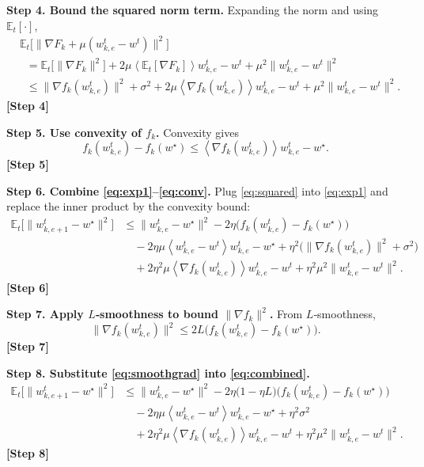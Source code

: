 \documentclass{article}
\newcommand{\EE}{\mathbb{E}}
\newcommand{\inner}[1]{\left\langle #1 \right\rangle}
\begin{document}
\noindent\textbf{Step 4.  Bound the squared norm term.}  
Expanding the norm and using $\EE_t[\cdot]$,
\begin{align}
&\EE_t\!\big[\|\nabla F_k+\mu(w^{t}_{k,e}-w^{t})\|^2\big] \nonumber\\
&\;\;= \EE_t\!\big[\|\nabla F_k\|^2\big]
    +2\mu\inner{\EE_t[\nabla F_k]}{w^{t}_{k,e}-w^{t}}
    +\mu^2\|w^{t}_{k,e}-w^{t}\|^2 \nonumber\\
&\;\;\le \|\nabla f_k(w^{t}_{k,e})\|^2+\sigma^2
    +2\mu\inner{\nabla f_k(w^{t}_{k,e})}{w^{t}_{k,e}-w^{t}}
    +\mu^2\|w^{t}_{k,e}-w^{t}\|^2 . \label{eq:squared}
\end{align}
\textbf{[Step 4]}

\noindent\textbf{Step 5.  Use convexity of $f_k$.}  
Convexity gives
\[
f_k(w^{t}_{k,e})-f_k(w^\star)\le\inner{\nabla f_k(w^{t}_{k,e})}{w^{t}_{k,e}-w^\star}. \label{eq:conv}
\]
\textbf{[Step 5]}

\noindent\textbf{Step 6.  Combine \eqref{eq:exp1}–\eqref{eq:conv}.}  
Plug \eqref{eq:squared} into \eqref{eq:exp1} and replace the inner product by the convexity bound:
\begin{align}
\EE_t\!\big[\|w^{t}_{k,e+1}-w^\star\|^2\big]
&\le \|w^{t}_{k,e}-w^\star\|^2
   -2\eta\big(f_k(w^{t}_{k,e})-f_k(w^\star)\big)                     \nonumber\\
&\quad -2\eta\mu\inner{w^{t}_{k,e}-w^{t}}{w^{t}_{k,e}-w^\star}
   +\eta^2\Big(\|\nabla f_k(w^{t}_{k,e})\|^2+\sigma^2\Big)           \nonumber\\
&\quad +2\eta^2\mu\inner{\nabla f_k(w^{t}_{k,e})}{w^{t}_{k,e}-w^{t}}
   +\eta^2\mu^2\|w^{t}_{k,e}-w^{t}\|^2 . \label{eq:combined}
\end{align}
\textbf{[Step 6]}

\noindent\textbf{Step 7.  Apply $L$‑smoothness to bound $\|\nabla f_k\|^2$.}  
From $L$‑smoothness,
\[
\|\nabla f_k(w^{t}_{k,e})\|^2\le 2L\big(f_k(w^{t}_{k,e})-f_k(w^\star)\big). \label{eq:smoothgrad}
\]
\textbf{[Step 7]}

\noindent\textbf{Step 8.  Substitute \eqref{eq:smoothgrad} into \eqref{eq:combined}.}  
\begin{align}
\EE_t\!\big[\|w^{t}_{k,e+1}-w^\star\|^2\big]
&\le \|w^{t}_{k,e}-w^\star\|^2
   -2\eta\big(1-\eta L\big)\big(f_k(w^{t}_{k,e})-f_k(w^\star)\big) \nonumber\\
&\quad -2\eta\mu\inner{w^{t}_{k,e}-w^{t}}{w^{t}_{k,e}-w^\star}
   +\eta^2\sigma^2                                          \nonumber\\
&\quad +2\eta^2\mu\inner{\nabla f_k(w^{t}_{k,e})}{w^{t}_{k,e}-w^{t}}
   +\eta^2\mu^2\|w^{t}_{k,e}-w^{t}\|^2 . \label{eq:post-smooth}
\end{align}
\textbf{[Step 8]}
\end{document}
